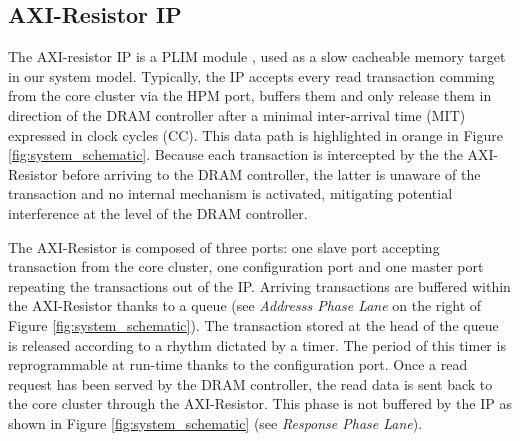     \subsection{AXI-Resistor IP}
        \label{subsec:axi-resistor}
        The AXI-resistor IP is a PLIM module \cite{PLIM20}, used as a slow cacheable memory target in our system model.
        Typically, the IP accepts every read transaction comming from the core cluster via the HPM port, buffers them and only release them in direction of the DRAM controller after a minimal inter-arrival time (MIT) expressed in clock cycles (CC).
        This data path is highlighted in orange in Figure \ref{fig:system_schematic}.
        Because each transaction is intercepted by the the AXI-Resistor before arriving to the DRAM controller, the latter is unaware of the transaction and no internal mechanism is activated, mitigating potential interference at the level of the DRAM controller.

        The AXI-Resistor is composed of three ports: one slave port accepting transaction from the core cluster, one configuration port and one master port repeating the transactions out of the IP.
        Arriving transactions are buffered within the AXI-Resistor thanks to a queue (see \emph{Addresss Phase Lane} on the right of Figure \ref{fig:system_schematic}).
        The transaction stored at the head of the queue is released according to a rhythm dictated by a timer.
        The period of this timer is reprogrammable at run-time thanks to the configuration port.
        Once a read request has been served by the DRAM controller, the read data is sent back to the core cluster through the AXI-Resistor.
        This phase is not buffered by the IP as shown in Figure \ref{fig:system_schematic} (see \emph{Response Phase Lane}).
